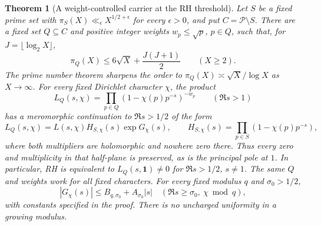 \documentclass[11pt]{article}
\newtheorem{theorem}{Theorem}[section]
\theoremstyle{definition}
\begin{document}
\begin{theorem}[A weight-controlled carrier at the RH threshold]
\label{thm:controlled-prime-carrier}
Let $S$ be a fixed prime set with
$\pi_S(X)\ll_\epsilon X^{1/2+\epsilon}$ for every $\epsilon>0$,
and put $C=\mathcal P\setminus S$.
There are a fixed set $Q\subseteq C$ and positive integer
weights $w_p\le\sqrt p$, $p\in Q$, such that, for
$J=\lfloor\log_2X\rfloor$,
\[
 \pi_Q(X)\le6\sqrt X+\frac{J(J+1)}2\qquad(X\ge2).
\]
The prime number theorem sharpens the order to
$\pi_Q(X)\asymp\sqrt X/\log X$ as $X\to\infty$.
For every fixed Dirichlet character $\chi$, the product
\[
 L_Q(s,\chi)=\prod_{p\in Q}(1-\chi(p)p^{-s})^{-w_p}
 \qquad(\Re s>1)
\]
has a meromorphic continuation to $\Re s>1/2$ of the form
\[
 L_Q(s,\chi)=L(s,\chi)H_{S,\chi}(s)\exp G_\chi(s),
 \qquad
 H_{S,\chi}(s)=\prod_{p\in S}(1-\chi(p)p^{-s}),
\]
where both multipliers are holomorphic and nowhere zero
there. Thus every zero and multiplicity in that half-plane
is preserved, as is the principal pole at $1$.
In particular, RH is equivalent to
$L_Q(s,\boldsymbol1)\ne0$ for $\Re s>1/2$, $s\ne1$.
The same $Q$ and weights work for all fixed characters.
For every fixed modulus $q$ and $\sigma_0>1/2$,
\[
 |G_\chi(s)|\le B_{q,\sigma_0}
                  +A_{\sigma_0}|s|
 \quad(\Re s\ge\sigma_0,\ \chi\bmod q),
\]
with constants specified in the proof.
There is no uncharged uniformity in a growing modulus.
\end{theorem}
\end{document}
